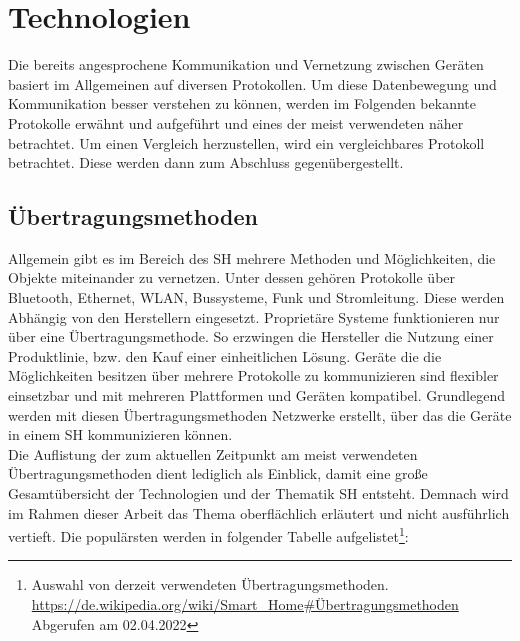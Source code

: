 \section{Technologien}
\label{sec:technologien}
    Die bereits angesprochene Kommunikation und Vernetzung zwischen Geräten basiert im Allgemeinen auf 
    diversen Protokollen. Um diese Datenbewegung und Kommunikation besser verstehen zu können, werden im 
    Folgenden bekannte Protokolle erwähnt und aufgeführt und eines der meist verwendeten näher betrachtet. 
    Um einen Vergleich herzustellen, wird ein vergleichbares Protokoll betrachtet. Diese werden dann zum 
    Abschluss gegenübergestellt. 

    \subsection{Übertragungsmethoden}
    \label{subsec:netzwerkprotokolle}
    Allgemein gibt es im Bereich des \acl{SH} mehrere Methoden und Möglichkeiten, die Objekte miteinander zu vernetzen. 
    Unter dessen gehören Protokolle über Bluetooth, Ethernet, WLAN, Bussysteme, Funk und Stromleitung. 
    Diese werden Abhängig von den Herstellern eingesetzt. Proprietäre Systeme funktionieren nur über eine 
    Übertragungsmethode. So erzwingen die Hersteller die Nutzung einer Produktlinie, bzw. den Kauf einer 
    einheitlichen Lösung. Geräte die die Möglichkeiten besitzen über mehrere Protokolle 
    zu kommunizieren sind flexibler einsetzbar und mit mehreren Plattformen und Geräten kompatibel.
    Grundlegend werden mit diesen Übertragungsmethoden Netzwerke erstellt, über das die Geräte in einem \acl{SH} kommunizieren können.
    \\
    \linebreak    
    Die Auflistung der zum aktuellen Zeitpunkt am meist verwendeten Übertragungsmethoden dient 
    lediglich als Einblick, damit eine große Gesamtübersicht der Technologien und der Thematik \acl{SH} entsteht. 
    Demnach wird im Rahmen dieser Arbeit das Thema oberflächlich erläutert und nicht ausführlich vertieft.
    Die populärsten werden in folgender Tabelle aufgelistet\footnote{Auswahl von derzeit verwendeten Übertragungsmethoden. \url{https://de.wikipedia.org/wiki/Smart_Home\#Übertragungsmethoden} Abgerufen am 02.04.2022}: 

